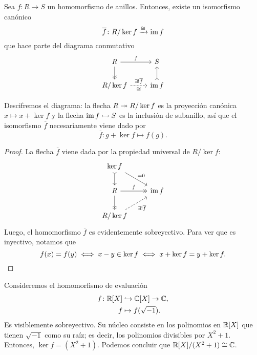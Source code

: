 \begin{proposicion}
  Sea $f\colon R\to S$ un homomorfismo de anillos. Entonces, existe
  un isomorfismo canónico
  $$\overline{f}\colon R/\ker f \xrightarrow{\cong} \operatorname{im} f$$
  que hace parte del diagrama conmutativo
  \[ \begin{tikzcd}
      R\ar{r}{f}\ar[->>]{d} & S \\
      R/\ker f\ar[dashed]{r}{\exists! \overline{f}}[swap]{\isom} & \im f\ar[>->]{u}
    \end{tikzcd} \]
\end{proposicion}

Descifremos el diagrama: la flecha $R\twoheadrightarrow R/\ker f$ es la proyección canónica
$x\mapsto x + \ker f$ y la flecha $\operatorname{im} f \rightarrowtail S$ es la inclusión de subanillo,
así que el isomorfismo $\overline{f}$ necesariamente viene dado por
$$\overline{f}\colon g + \ker f \mapsto f (g).$$

\begin{proof}
  La flecha $\overline{f}$ viene dada por la propiedad universal de $R/\ker f$:
  \[ \begin{tikzcd}
      \ker f\ar[>->]{d}\ar{dr}{=0}\\
      R\ar[->>]{r}{f}\ar[->>]{d} & \im f \\
      R/\ker f\ar[dashed]{ur}[swap]{\exists! \overline{f}}
    \end{tikzcd} \]
  Luego, el homomorfismo $\overline{f}$ es evidentemente sobreyectivo. Para ver
  que es inyectivo, notamos que
  \[ f (x) = f (y) \iff x-y \in \ker f
     \iff
     x + \ker f = y + \ker f. \qedhere \]
\end{proof}

\begin{ejemplo}
  Consideremos el homomorfismo de evaluación
  \begin{align*}
    f\colon \mathbb{R} [X] & \hookrightarrow \mathbb{C} [X] \to \mathbb{C},\\
    f & \mapsto f (\sqrt{-1}).
  \end{align*}
  Es visiblemente sobreyectivo. Su núcleo consiste en los polinomios en
  $\mathbb{R} [X]$ que tienen $\sqrt{-1}$ como su raíz; es decir, los polinomios
  divisibles por $X^2 + 1$. Entonces, $\ker f = (X^2 + 1)$. Podemos concluir
  que $\mathbb{R} [X]/(X^2 + 1) \cong \mathbb{C}$.
\end{ejemplo}

